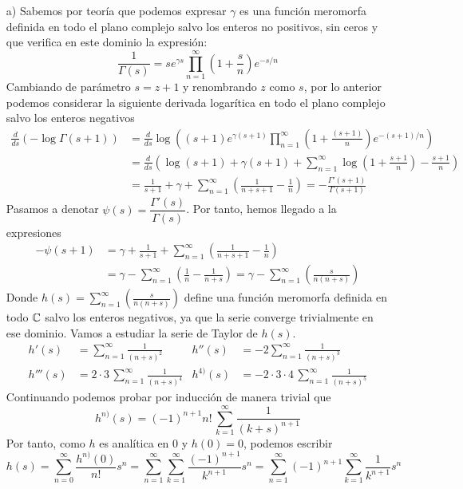\documentclass[twoside]{article}
\begin{document}
\begin{sol}
\begin{itemize}
\item[]
\item[a)] Sabemos por teoría que podemos expresar $\gamma$ es una función meromorfa definida en todo el plano complejo salvo los enteros no positivos, sin ceros y que verifica en este dominio la expresión:
\[ \frac{1}{Γ(s)} = s e^{γs} \prod_{n=1}^{∞} \left(1 + \frac{s}{n}\right) e^{-s/n} \]
Cambiando de parámetro $s=z+1$ y renombrando $z$ como $s$, por lo anterior podemos considerar la siguiente derivada logarítica en todo el plano complejo salvo los enteros negativos
\begin{align*}
\frac{d}{ds}\left(-\log \Gamma(s+1)\right) &=  \frac{d}{ds}\log\left((s+1) e^{γ(s+1)} \prod_{n=1}^{∞} \left(1 + \frac{(s+1)}{n}\right) e^{-(s+1)/n}\right)\\
&= \frac{d}{ds}\left( \log(s+1)+\gamma(s+1)+\sum_{n=1}^\infty \log\left(1+\frac{s+1}{n}\right)-\frac{s+1}{n}\right)\\
&= \frac{1}{s+1} +\gamma + \sum_{n=1}^\infty \left(\frac{1}{n+s+1}-\frac{1}{n}\right)= -\frac{\Gamma'(s+1)}{\Gamma(s+1)}
\end{align*}
Pasamos a denotar $\psi(s) = \dfrac{\Gamma'(s)}{\Gamma(s)}$. Por tanto, hemos llegado a la expresiones
\begin{align*}
-\psi(s+1) &= \gamma+\frac{1}{s+1} + \sum_{n=1}^\infty \left(\frac{1}{n+s+1}-\frac{1}{n}\right)\\
& = \gamma -\sum_{n=1}^\infty \left(\frac{1}{n} - \frac{1}{n+s}\right) = \gamma -\sum_{n=1}^\infty \left(\frac{s}{n(n+s)}\right) 
\end{align*}
Donde $h(s)=\sum_{n=1}^\infty \left(\frac{s}{n(n+s)}\right)$ define una función meromorfa definida en todo $\mathbb{C}$ salvo los enteros negativos, ya que la serie converge trivialmente en ese dominio. Vamos a estudiar la serie de Taylor de $h(s)$.
\begin{align*}
h'(s) & = \sum_{n=1}^\infty\frac{1}{(n+s)^2} & h''(s)&=  -2\sum_{n=1}^\infty\frac{1}{(n+s)^3}\\
h'''(s) &= 2 \cdot 3 \, \sum_{n=1}^\infty\frac{1}{(n+s)^4} &  h^{4)}(s) &= -2 \cdot 3 \cdot 4 \,\sum_{n=1}^\infty\frac{1}{(n+s)^5}
\end{align*}
Continuando podemos probar por inducción de manera trivial que
$$h^{n)}(s) = (-1)^{n+1}n!\,\sum_{k=1}^\infty\frac{1}{(k+s)^{n+1}}$$
Por tanto, como $h$ es analítica en $0$ y $h(0)=0$, podemos escribir
$$
h(s)=\sum_{n=0}^\infty \frac{h^{n)}(0)}{n!}s^n = \sum_{n=1}^\infty\sum_{k=1}^\infty\frac{(-1)^{n+1}}{k^{n+1}}  s^n = \sum_{n=1}^\infty(-1)^{n+1}\sum_{k=1}^\infty\frac{1}{k^{n+1}}  s^n 
$$
\end{itemize}
\end{sol}
\end{document}
